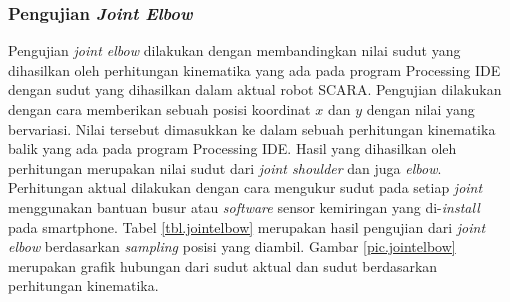  \subsubsection{Pengujian \textit{Joint Elbow}}
 Pengujian \textit{joint elbow} dilakukan dengan membandingkan nilai sudut yang dihasilkan oleh perhitungan kinematika yang ada pada program Processing IDE dengan sudut yang dihasilkan dalam aktual robot SCARA. Pengujian dilakukan dengan cara memberikan sebuah posisi koordinat $x$ dan $y$ dengan nilai yang bervariasi. Nilai tersebut dimasukkan ke dalam sebuah perhitungan kinematika balik yang ada pada program Processing IDE. Hasil yang dihasilkan oleh perhitungan merupakan nilai sudut dari \textit{joint shoulder} dan juga \textit{elbow}. Perhitungan aktual dilakukan dengan cara mengukur sudut pada setiap \textit{joint} menggunakan bantuan busur atau \textit{software} sensor kemiringan yang di-\textit{install} pada smartphone. Tabel \ref{tbl.jointelbow} merupakan hasil pengujian dari \textit{joint elbow} berdasarkan \textit{sampling} posisi yang diambil. Gambar \ref{pic.jointelbow} merupakan grafik hubungan dari sudut aktual dan sudut berdasarkan perhitungan kinematika. 
 
